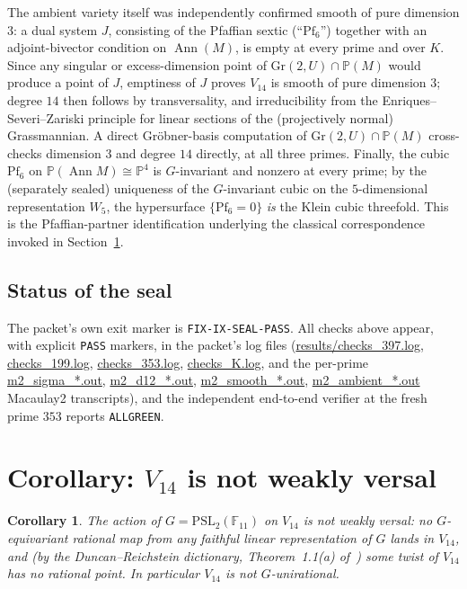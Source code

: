 \documentclass[11pt]{article}
\theoremstyle{plain}
\newtheorem{corollary}[theorem]{Corollary}
\theoremstyle{definition}
\theoremstyle{remark}
\newcommand{\PSL}{\mathrm{PSL}_2(\mathbb{F}_{11})}
\newcommand{\Grr}{\mathrm{Gr}}
\DeclareMathOperator{\Ann}{Ann}
\newcommand{\PP}{\mathbb P}
\begin{document}
The ambient variety itself was independently confirmed smooth of pure
dimension $3$: a dual system $J$, consisting of the Pfaffian sextic
(``$\mathrm{Pf}_6$'') together with an adjoint-bivector condition on
$\Ann(M)$, is empty at every prime and over $K$. Since any singular or
excess-dimension point of $\Grr(2,U)\cap\PP(M)$ would produce a point of
$J$, emptiness of $J$ proves $V_{14}$ is smooth of pure dimension $3$;
degree $14$ then follows by transversality, and irreducibility from the
Enriques--Severi--Zariski principle for linear sections of the
(projectively normal) Grassmannian. A direct Gr\"obner-basis computation
of $\Grr(2,U)\cap\PP(M)$ cross-checks dimension $3$ and degree $14$
directly, at all three primes. Finally, the cubic $\mathrm{Pf}_6$ on
$\PP(\Ann M)\cong\PP^4$ is $G$-invariant and nonzero at every prime; by
the (separately sealed) uniqueness of the $G$-invariant cubic on the
$5$-dimensional representation $W_5$, the hypersurface $\{\mathrm{Pf}_6
=0\}$ \emph{is} the Klein cubic threefold. This is the Pfaffian-partner
identification underlying the classical correspondence invoked in
Section~\ref{sec:cor}.

\subsection{Status of the seal}

The packet's own exit marker is \texttt{FIX-IX-SEAL-PASS}. All checks
above appear, with explicit \texttt{PASS} markers, in the packet's log
files (\url{results/checks_397.log}, \url{checks_199.log},
\url{checks_353.log}, \url{checks_K.log}, and the per-prime
\url{m2_sigma_*.out}, \url{m2_d12_*.out}, \url{m2_smooth_*.out},
\url{m2_ambient_*.out} Macaulay2 transcripts), and the independent
end-to-end verifier at the fresh prime $353$ reports
\texttt{ALLGREEN}.

\section{Corollary: \texorpdfstring{$V_{14}$}{V14} is not weakly versal}
\label{sec:cor}

\begin{corollary}
\label{cor:v14}
The action of $G=\PSL$ on $V_{14}$ is not weakly versal: no
$G$-equivariant rational map from any faithful linear representation of
$G$ lands in $V_{14}$, and (by the Duncan--Reichstein dictionary,
Theorem~1.1(a) of~\cite{DR}) some twist of $V_{14}$ has no rational
point. In particular $V_{14}$ is not $G$-unirational.
\end{corollary}
\end{document}

